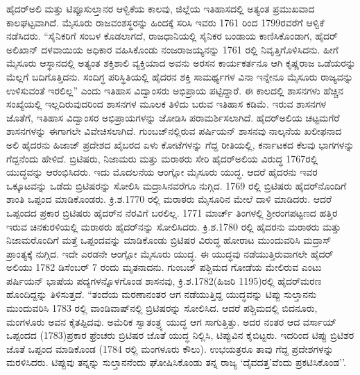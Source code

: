 ಹೈದರ್​ಅಲಿ ಮತ್ತು ಟಿಪ್ಪೂಸುಲ್ತಾನರ ಆಳ್ವಿಕೆಯ ಕಾಲವು, ಜಿಲ್ಲೆಯ ಇತಿಹಾಸದಲ್ಲಿ ಅತ್ಯಂತ ಪ್ರಮುಖವಾದ ಕಾಲಘಟ್ಟವಾಗಿದೆ. ಮೈಸೂರು ರಾಜವಂಶಸ್ಥರನ್ನು ಹಿಂದಕ್ಕೆ ಸರಿಸಿ ಇವರು 1761 ರಿಂದ 1799ರವರೆಗೆ ಆಳ್ವಿಕೆ ನಡೆಸಿದರು. “ಸೈನಿಕರಿಗೆ ಸಂಬಳ ಕೊಡಲಾಗದೆ, ರಾಜಧಾನಿಯಲ್ಲಿ ಸೈನಿಕರ ಬಂಡಾಯ ಕಾಣಿಸಿಕೊಂಡಾಗ, ಹೈದರ್ ಅಲಿಖಾನ್ ದಳವಾಯಿಯ ಅಧಿಕಾರ ವಹಿಸಿಕೊಂಡು ನಂಜರಾಜಯ್ಯನನ್ನು 1761 ರಲ್ಲಿ ನಿವೃತ್ತಿಗೊಳಿಸಿದನು. ಹೀಗೆ ಮೈಸೂರು ಆಸ್ಥಾನದಲ್ಲಿ ಅತ್ಯಂತ ಶಕ್ತಿಶಾಲಿ ವ್ಯಕ್ತಿಯಾದ ಅವನು ಅರಸನ ಕಾರ್ಯಕರ್ತನೂ ಆಗಿ ಕೃಷ್ಣರಾಜ ಒಡೆಯರನ್ನು ಮೆಲ್ಲಗೆ ಬದಿಗೊತ್ತಿದನು. ಸಂದಿಗ್ಧ ಪರಿಸ್ಥಿತಿಯಲ್ಲಿ ಹೈದರನ ಶಕ್ತಿ ಸಾಮರ್ಥ್ಯಗಳ ವಿನಾ ಇನ್ನೇನೂ ಮೈಸೂರು ರಾಜ್ಯವನ್ನು ಉಳಿಸುವಂತೆ ಇರಲಿಲ್ಲ'' ಎಂದು ಇತಿಹಾಸ ವಿದ್ವಾಂಸರು ಅಭಿಪ್ರಾಯ ಪಟ್ಟಿದ್ದಾರೆ. ಈ ಕಾಲದಲ್ಲಿ ಶಾಸನಗಳು ಹೆಚ್ಚಿನ ಸಂಖ್ಯೆಯಲ್ಲಿ ಇಲ್ಲದಿರುವುದರಿಂದ ಶಾಸನಗಳ ಮೂಲಕ ತಿಳಿದು ಬರುವ ಇತಿಹಾಸ ಕಡಿಮೆ. ಇರುವ ಶಾಸನಗಳ ಜೊತೆಗೆ, ಇತಿಹಾಸ ವಿದ್ವಾಂಸರ ಅಭಿಪ್ರಾಯಗಳನ್ನು ಜೋಡಿಸಿ ಪರಾಮರ್ಶಿಸಲಾಗಿದೆ. ಹೈದರ್​ಅಲಿಯ ಚಟ್ಟಮಗೆರೆ ಶಾಸನಗಳನ್ನು ಈಗಾಗಲೇ ವಿವೇಚಿಸಲಾಗಿದೆ. ಗುಂಬಜ್​ನಲ್ಲಿರುವ ಪರ್ಷಿಯನ್​ ಶಾಸನವು ನಾಲ್ಕನೆಯ ಖಲೀಫನಾದ ಅಲಿ ಹೈದರನು ಹಿಜಾಜ್​ ಪ್ರದೇಶದ ಖೈಬರದ ಏಳು ಕೋಟೆಗಳನ್ನು ಗೆದ್ದ ರೀತಿಯಲ್ಲಿ, ಕರ್ನಾಟಕದ ಕೆಲವು ಭಾಗಗಳನ್ನು ಗೆದ್ದನೆಂದು ಹೇಳಿದೆ. ಬ್ರಿಟಿಷರು, ನಿಜಾಮರು ಮತ್ತು ಮರಾಠರು ಸೇರಿ ಹೈದರ್​ ಅಲಿಯ ವಿರುದ್ಧ 1767ರಲ್ಲಿ ಯುದ್ಧವನ್ನು ಆರಂಭಿಸಿದರು. ಇದು ಮೊದಲನೆಯ ಆಂಗ್ಲೋ ಮೈಸೂರು ಯುದ್ಧ. ಆದರೆ ಹೈದರನು ಇವರ ಒಕ್ಕೂಟವನ್ನು ಒಡೆದು ಬ್ರಿಟಿಷರನ್ನು ಸೋಲಿಸಿ ಮದ್ರಾಸಿನವರೆಗೂ ನುಗ್ಗಿದ. 1769 ರಲ್ಲಿ ಬ್ರಿಟಿಷರು ಹೈದರ್​ನೊಂದಿಗೆ ಶಾಂತಿ ಒಪ್ಪಂದ ಮಾಡಿಕೊಂಡರು. ಕ್ರಿ.ಶ.1770 ರಲ್ಲಿ ಮರಾಠರು ಮೈಸೂರಿನ ಮೇಲೆ ದಾಳಿ ಮಾಡಿದರು. ಆದರೆ ಒಪ್ಪಂದದ ಪ್ರಕಾರ ಬ್ರಿಟಿಷರು ಹೈದರ್​ನ ನೆರವಿಗೆ ಬರಲಿಲ್ಲ. 1771 ಮಾರ್ಚ್ ತಿಂಗಳಲ್ಲಿ ಶ‍್ರೀರಂಗಪಟ್ಟಣದ ಹತ್ತಿರ ಇರುವ ಚಿನಕುರಳಿಯಲ್ಲಿ ಮರಾಠರು ಹೈದರ್​ನನ್ನು ಸೋಲಿಸಿದರು. ಕ್ರಿ.ಶ.1780 ರಲ್ಲಿ ಹೈದರನು ಮರಾಠರು ಮತ್ತು ನಿಜಾಮರೊಂದಿಗೆ ಮತ್ತೆ ಒಪ್ಪಂದವನ್ನು ಮಾಡಿಕೊಂಡು ಬ್ರಿಟಿಷರ ವಿರುದ್ಧ ಹೋರಾಟ ಮುಂದುವರಿಸಿ ಮದ್ರಾಸ್​ ಪ್ರಾಂತ್ಯಕ್ಕೆ ನುಗ್ಗಿದ. ಇದೇ ಎರಡನೇ ಆಂಗ್ಲೋ ಮೈಸೂರು ಯುದ್ಧ. ಈ ಯುದ್ಧವು ನಡೆಯುತ್ತಿರುವಾಗಲೇ ಹೈದರ್​ಅಲಿಯು 1782 ಡಿಸೆಂಬರ್​ 7 ರಂದು ಮೃತನಾದನು. ಗುಂಬಜ್​ ಪಶ್ಚಿಮದ ಗೋಡೆಯ ಮೇಲಿರುವ ಎಂಟು ಪರ್ಷಿಯನ್​ ಭಾಷೆಯ ಪದ್ಯಗಳನ್ನೊಳಗೊಂಡ ಶಾಸನವು, ಕ್ರಿ.ಶ.1782(ಹಿಜರಿ 1195)ರಲ್ಲಿ ಹೈದರ್​ ಮರಣ ಹೊಂದಿದ್ದನ್ನು ತಿಳಿಸುತ್ತದೆ. “ತಂದೆಯ ಮರಣಾನಂತರ ಆಗ ನಡೆಯುತ್ತಿದ್ದ ಯುದ್ಧವನ್ನು ಟಿಪ್ಪು ಸುಲ್ತಾನನು ಮುಂದುವರಿಸಿ 1783 ರಲ್ಲಿ ವಾಂಡಿವಾಷ್​ನಲ್ಲಿ ಬ್ರಿಟಿಷರನ್ನು ಸೋಲಿಸಿದ. ಆದರೆ ಪಶ್ಚಿಮದಲ್ಲಿ ಬಿದನೂರು, ಮಂಗಳೂರು ಅವನ ಕೈತಪ್ಪಿದವು. ಅಮೆರಿಕ ಸ್ವಾತಂತ್ರ್ಯ ಯುದ್ಧ ಆಗ ಸಾಗುತ್ತಿತ್ತು. ಅದರ ನಂತರ ಆದ ವರ್ಸಾಯ್ ಒಪ್ಪಂದದ (1783)ಪ್ರಕಾರ ಫ್ರೆಂಚರು ಬ್ರಿಟಿಷರ ಜೊತೆ ಯುದ್ಧ ನಿಲ್ಲಿಸಿ, ಟಿಪ್ಪುವಿನ ಕೈಬಿಟ್ಟರು. ಇದರಿಂದ ಟಿಪ್ಪು ಬ್ರಿಟಿಶರ ಜೊತೆ ಒಪ್ಪಂದ ಮಾಡಿಕೊಂಡ (1784 ರಲ್ಲಿ ಮಂಗಳೂರು ಕೌಲು). ಉಭಯತ್ರರೂ ತಾವು ಗೆದ್ದ ಪ್ರದೇಶಗಳನ್ನು ಮರಳಿಸಿದರು. ಟಿಪ್ಪುವು ತನ್ನನ್ನು ಸುಲ್ತಾನನೆಂದು ಘೋಷಿಸಿಕೊಂಡು ತನ್ನ ರಾಜ್ಯ `ದೈವದತ್ತ'ವೆಂದು ಪ್ರಕಟಿಸಿಕೊಂಡ''.

